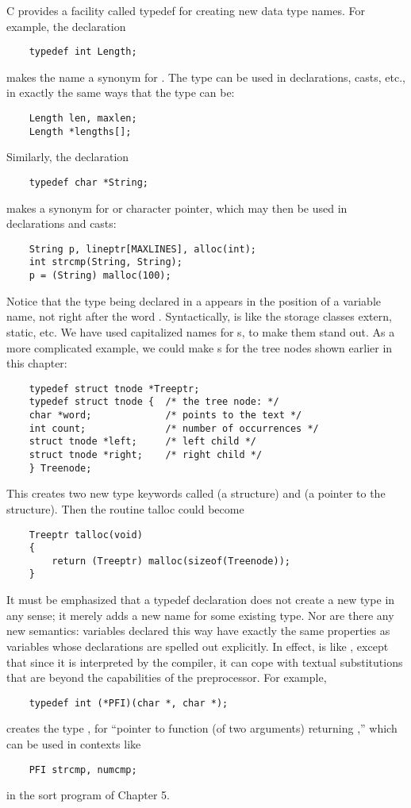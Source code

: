 C provides a facility called typedef for creating new data type names. For example, the declaration
\begin{lstlisting}
	typedef int Length;
\end{lstlisting}
makes the name  a synonym for . The type  can be used in declarations, casts, etc., in exactly the same ways that the  type can be:
\begin{lstlisting}
	Length len, maxlen;
	Length *lengths[];
\end{lstlisting}
Similarly, the declaration
\begin{lstlisting}
	typedef char *String;
\end{lstlisting}
makes  a synonym for  or character pointer, which may then be used in declarations and casts:
\begin{lstlisting}
	String p, lineptr[MAXLINES], alloc(int);
	int strcmp(String, String);
	p = (String) malloc(100);
\end{lstlisting}
Notice that the type being declared in a  appears in the position of a variable name, not right after the word .
Syntactically,  is like the storage classes extern, static, etc.
We have used capitalized names for s, to make them stand out.
As a more complicated example, we could make s for the tree nodes shown earlier in this chapter:
\begin{lstlisting}
	typedef struct tnode *Treeptr;
	typedef struct tnode { 	/* the tree node: */
	char *word; 			/* points to the text */
	int count; 				/* number of occurrences */
	struct tnode *left; 	/* left child */
	struct tnode *right; 	/* right child */
	} Treenode;
\end{lstlisting}
This creates two new type keywords called  (a structure) and  (a pointer to the structure).
Then the routine talloc could become
\begin{lstlisting}
	Treeptr talloc(void)
	{
		return (Treeptr) malloc(sizeof(Treenode));
	}
\end{lstlisting}
It must be emphasized that a typedef declaration does not create a new type in any sense; it merely adds a new name for some existing type.
Nor are there any new semantics: variables declared this way have exactly the same properties as variables whose declarations are spelled out explicitly.
In effect,  is like , except that since it is interpreted by the compiler, it can cope with textual substitutions that are beyond the capabilities of the preprocessor.
For example,
\begin{lstlisting}
	typedef int (*PFI)(char *, char *);
\end{lstlisting}
creates the type , for ``pointer to function (of two  arguments) returning ,'' which can be used in contexts like
\begin{lstlisting}
	PFI strcmp, numcmp;
\end{lstlisting}
in the sort program of Chapter 5.

